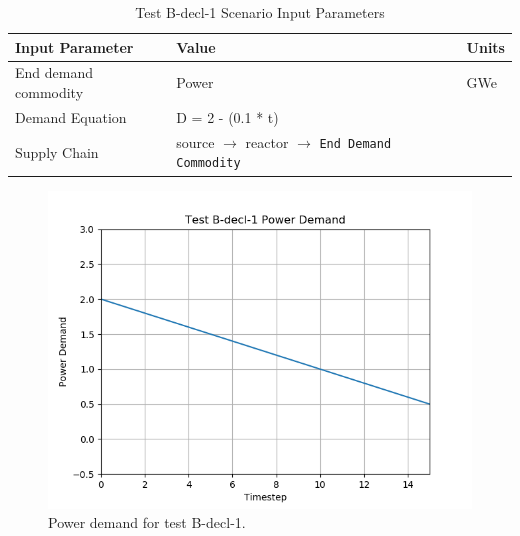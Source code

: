 \documentclass[11pt,letterpaper]{article}
\begin{document}
\begin{table}[H]
	\centering
	\caption{Test B-decl-1 Scenario Input Parameters }
	\label{tab:test_B-decl-1}
	\begin{tabular}{|l|l|l|}
		\hline
		\textbf{Input Parameter} & \textbf{Value} & \textbf{Units} \\
		\hline
		End demand commodity & Power & GWe \\
		Demand Equation & D = 2 - (0.1 * t) & \\
		Supply Chain & source $\rightarrow$ reactor $\rightarrow$ \texttt{End Demand Commodity} &  \\
		\hline
	\end{tabular}
\end{table}

\begin{figure}[H]
	\begin{center}
		\includegraphics[scale=0.7]{./images/B-decl-1.png}
	\end{center}
	\caption{Power demand for test B-decl-1.}
	\label{fig:B-decl-1}
\end{figure}
\end{document}
